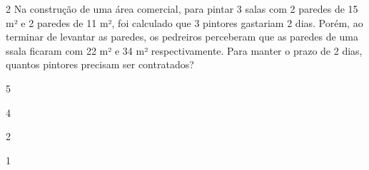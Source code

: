 

\num{2} Na construção de uma área comercial, para pintar 3 salas com 2
paredes de 15 m² e 2 paredes de 11 m², foi calculado que 3 pintores
gastariam 2 dias. Porém, ao terminar de levantar as paredes, os
pedreiros perceberam que as paredes de uma ssala ficaram com 22 m² e 34
m² respectivamente. Para manter o prazo de 2 dias, quantos pintores
precisam ser contratados?

\begin{escolha}
\item 5
\item 4
\item 2
\item 1
\end{escolha}


